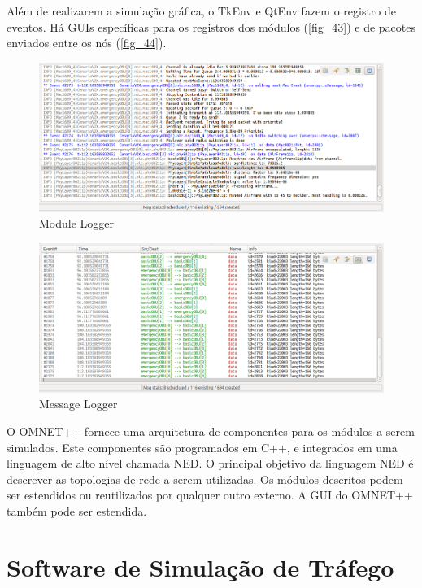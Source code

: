 \documentclass[
12pt,				%
openright,			%
oneside,			%
a4paper,			%
brazil,				%
]{abntex2}
\begin{document}
	\newpage
		
	\par Além de realizarem a simulação gráfica, o TkEnv e QtEnv fazem o registro de eventos. Há GUIs específicas para os registros dos módulos (\autoref{fig_43}) e de pacotes enviados entre os nós (\autoref{fig_44}).
	
	\begin{figure} [H]
		\centering
		\includegraphics[scale=.4]{figuras/cap4/43ModuleLog}
		\caption{\label{fig_43}Module Logger}
	\end{figure}
	
	\begin{figure} [H]
		\centering
		\includegraphics[scale=.4]{figuras/cap4/44MessageLog}
		\caption{\label{fig_44}Message Logger}
	\end{figure}
		
	\par O OMNET++ fornece uma arquitetura de componentes para os módulos a serem simulados. Este componentes são programados em C++, e integrados em uma linguagem de alto nível chamada NED. O principal objetivo da linguagem NED é descrever as topologias de rede a serem utilizadas. Os módulos descritos podem ser estendidos ou reutilizados por qualquer outro externo. A GUI do OMNET++ também pode ser estendida.
	
	\section{Software de Simulação de Tráfego}
	
\end{document}
